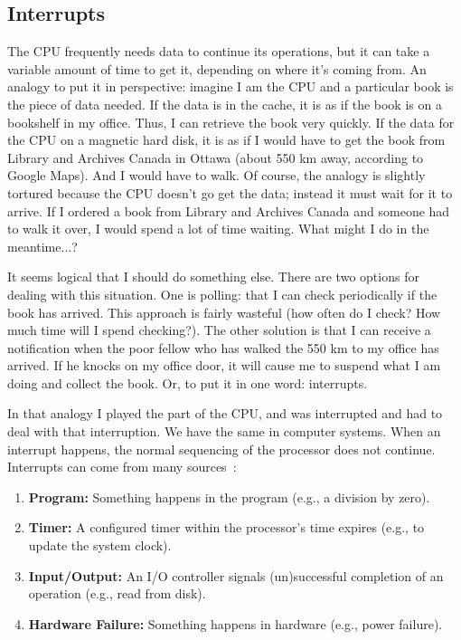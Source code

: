 \documentclass[a4paper]{report}
\begin{document}
\subsection*{Interrupts}

The CPU frequently needs data to continue its operations, but it can take a variable amount of time to get it, depending on where it's coming from. An analogy to put it in perspective: imagine I am the CPU and a particular book is the piece of data needed. If the data is in the cache, it is as if the book is on a bookshelf in my office. Thus, I can retrieve the book very quickly. If the data for the CPU on a magnetic hard disk, it is as if I would have to get the book from Library and Archives Canada in Ottawa (about 550 km away, according to Google Maps). And I would have to walk. Of course, the analogy is slightly tortured because the CPU doesn't go get the data; instead it must wait for it to arrive. If I ordered a book from Library and Archives Canada and someone had to walk it over, I would spend a lot of time waiting. What might I do in the meantime...?

It seems logical that I should do something else. There are two options for dealing with this situation. One is polling: that I can check periodically if the book has arrived. This approach is fairly wasteful (how often do I check? How much time will I spend checking?). The other solution is that I can receive a notification when the poor fellow who has walked the 550 km to my office has arrived. If he knocks on my office door, it will cause me to suspend what I am doing and collect the book. Or, to put it in one word: interrupts.

In that analogy I played the part of the CPU, and was interrupted and had to deal with that interruption. We have the same in computer systems. When an interrupt happens, the normal sequencing of the processor does not continue. Interrupts can come from many sources~\cite{osi}:

\begin{enumerate}
	\item \textbf{Program:} Something happens in the program (e.g., a division by zero).
	\item \textbf{Timer:} A configured timer within the processor's time expires (e.g., to update the system clock).
	\item \textbf{Input/Output:} An I/O controller signals (un)successful completion of an operation (e.g., read from disk).
	\item \textbf{Hardware Failure:} Something happens in hardware (e.g., power failure).
\end{enumerate}
\end{document}
